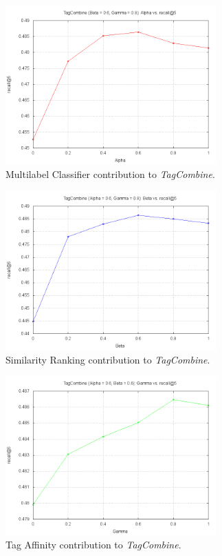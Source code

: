\documentclass[10pt]{IEEEtran}
\begin{document}
\begin{figure}[h]
  \centering
    \includegraphics[width=3.2in]{tc_alpha.png}
  \caption{Multilabel Classifier contribution to \textit{TagCombine}.}
  \label{fig:tc_alpha}
\end{figure}
\begin{figure}[h]
  \centering
    \includegraphics[width=3.2in]{tc_beta.png}
  \caption{Similarity Ranking contribution to \textit{TagCombine}.}
  \label{fig:tc_beta}
\end{figure}
\begin{figure}[h]
  \centering
    \includegraphics[width=3.2in]{tc_gamma.png}
  \caption{Tag Affinity contribution to \textit{TagCombine}.}
  \label{fig:tc_gamma}
\end{figure}
\end{document}
